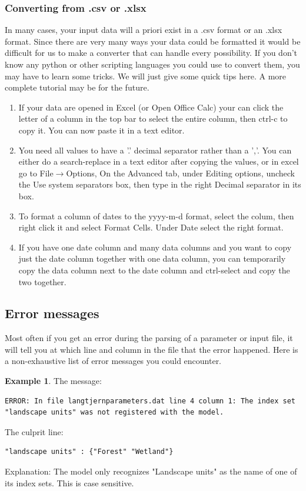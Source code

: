 \documentclass[11pt]{article}
\theoremstyle{definition}
\newtheorem{myexample}{Example}
\newenvironment{example}%
  {\begin{lrbox}{\examplebox}%
   \begin{minipage}{\dimexpr\linewidth-2\fboxsep}
   \begin{myexample}}%
  {\end{myexample}%
   \end{minipage}%
   \end{lrbox}%
   \begin{trivlist}
     \item[]\colorbox{silver}{\usebox\examplebox}
   \end{trivlist}}
\begin{document}
\subsubsection{Converting from .csv or .xlsx}
In many cases, your input data will a priori exist in a .csv format or an .xlsx format. Since there are very many ways your data could be formatted it would be difficult for us to make a converter that can handle every possibility. If you don't know any python or other scripting languages you could use to convert them, you may have to learn some tricks. We will just give some quick tips here. A more complete tutorial may be for the future.

\begin{enumerate}[i]
\item If your data are opened in Excel (or Open Office Calc) your can click the letter of a column in the top bar to select the entire column, then ctrl-c to copy it. You can now paste it in a text editor.
\item You need all values to have a '.' decimal separator rather than a ','. You can either do a search-replace in a text editor after copying the values, or in excel go to File$\rightarrow$Options, On the Advanced tab, under Editing options, uncheck the Use system separators box, then type in the right Decimal separator in its box.
\item To format a column of dates to the yyyy-m-d format, select the colum, then right click it and select Format Cells. Under Date select the right format.
\item If you have one date column and many data columns and you want to copy just the date column together with one data column, you can temporarily copy the data column next to the date column and ctrl-select and copy the two together.
\end{enumerate}

\subsection{Error messages}

Most often if you get an error during the parsing of a parameter or input file, it will tell you at which line and column in the file that the error happened. Here is a non-exhaustive list of error messages you could encounter.

\begin{example}
The message:
\begin{lstlisting}
ERROR: In file langtjernparameters.dat line 4 column 1: The index set "landscape units" was not registered with the model.
\end{lstlisting}
The culprit line:
\begin{lstlisting}
"landscape units" : {"Forest" "Wetland"}
\end{lstlisting}
Explanation: The model only recognizes "Landscape units" as the name of one of its index sets. This is case sensitive.
\end{example}
\end{document}

